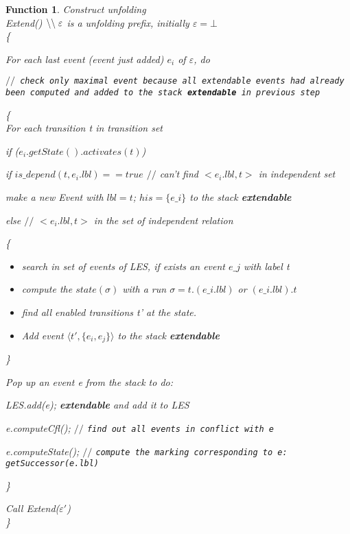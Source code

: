 \documentclass[11pt]{article}
\newtheorem{function}{Function}
\begin{document}
	\begin{function}{Construct unfolding\\}
		Extend() $\backslash\backslash \thickspace \varepsilon$ is a unfolding prefix, initially 								$\varepsilon=\bot$\\
		\{
	
			For each last event (event just added) $e_i$ of $\varepsilon$, do
			
			\texttt{$//$ check only maximal event because all extendable events had already been computed and added 						to the stack \textbf{extendable} in previous step } 
			
			\{	\\
								
			 	For each transition t in transition set
			 		
			 		if ($e_i.getState().activates(t)$)
					
				\qquad if $is\_depend(t, e_i.lbl)==true $
						$//$ can't find $<e_i.lbl,t>$ in independent set
		
					\qquad\qquad make a new Event with $lbl=t$; $his = \{e\_i\}$ to the stack \textbf{extendable} 
					
				\qquad else 	$//$ $<e_i.lbl,t>$ in the set of independent relation
				
						\qquad \{			
						\begin{itemize}
						\renewcommand\labelitemi{-}
							\item \qquad search in set of events of LES, if exists an event $e\_j$ with label t
							\item \qquad compute the 	$state(\sigma)$ with a run $\sigma=t.(e\_i.lbl)$ or 													$(e\_i.lbl).t$
							\item \qquad find all enabled transitions t' at the state.
							\item \qquad Add event $\langle t', \{e_i,e_j\}\rangle$ to the stack \textbf{extendable}
						\end{itemize}
							
						\qquad \}
			
				Pop up an event e from the stack to do: 
				
					\qquad LES.add(e); \textbf{extendable} and add it to LES
						
					\qquad e.computeCfl(); $//$ \texttt{find out all events in conflict with e}
						
					\qquad e.computeState(); $//$ \texttt{compute the marking corresponding to e: 													getSuccessor(e.lbl)}
					
				\}
	
				Call Extend($\varepsilon'$)\\
		\}
\end{function}
\end{document}
